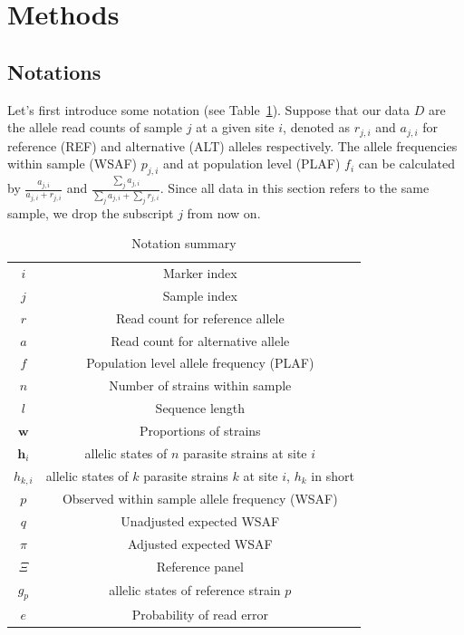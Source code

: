 \documentclass{bioinfo}
\begin{document}
\begin{methods}
\end{methods}


\section{Methods}

\subsection{Notations}
Let's first introduce some notation (see Table~\ref{tab:notation}). Suppose that our data $D$ are the allele read counts of sample $j$ at a given site $i$, denoted as $r_{j,i}$ and $a_{j,i}$ for reference (REF) and alternative (ALT) alleles respectively. The allele frequencies within sample (WSAF) $p_{j,i}$ and at population level (PLAF) $f_i$ can be calculated by $ \frac{a_{j,i}}{a_{j,i} + r_{j,i}}$ and $ \frac{\sum_j a_{j,i}}{\sum_j a_{j,i} + \sum_j r_{j,i}}$. Since all data in this section refers to the same sample, we drop the subscript $j$ from now on.

\begin{table}[htb]\centering
\begin{tabular}{c|c}\hline
$i$              & Marker index\\
$j$              & Sample index \\
$r$              & Read count for reference allele \\
$a$              & Read count for alternative allele \\
$f$              & Population level allele frequency (PLAF) \\
$n$              & Number of strains within sample \\
$l$              & Sequence length \\
$\mathbf w$      & Proportions of strains \\
$\mathbf{h}_{i}$ & allelic states of $n$ parasite strains at site $i$ \\
$h_{k,i}$        & allelic states of $k$ parasite strains $k$ at site $i$, $h_k$ in short \\
$p$              & Observed within sample allele frequency (WSAF) \\
$q$              & Unadjusted expected WSAF  \\
$\pi$            & Adjusted expected WSAF \\
$\Xi$            & Reference panel\\
$g_{p}$          & allelic states of reference strain $p$\\
$e$              & Probability of read error\\ \hline
\end{tabular}
\caption{Notation summary}\label{tab:notation}
\end{table}
\end{document}
